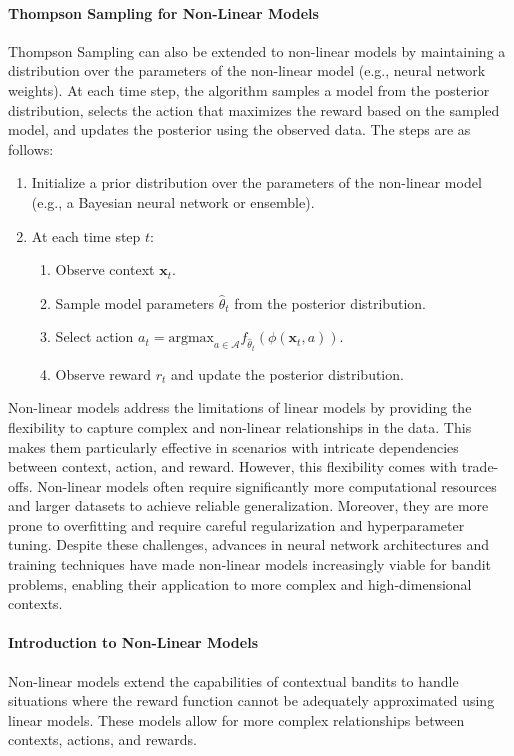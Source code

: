\paragraph{Thompson Sampling for Non-Linear Models}
Thompson Sampling can also be extended to non-linear models by maintaining a distribution over the parameters of the non-linear model (e.g., neural network weights). At each time step, the algorithm samples a model from the posterior distribution, selects the action that maximizes the reward based on the sampled model, and updates the posterior using the observed data. The steps are as follows:
\begin{enumerate}
    \item Initialize a prior distribution over the parameters of the non-linear model (e.g., a Bayesian neural network or ensemble).
    \item At each time step $t$:
    \begin{enumerate}
        \item Observe context $\mathbf{x}_t$.
        \item Sample model parameters $\hat{\theta}_t$ from the posterior distribution.
        \item Select action $a_t = \text{argmax}_{a \in \mathcal{A}} f_{\hat{\theta}_t}(\phi(\mathbf{x}_t, a))$.
        \item Observe reward $r_t$ and update the posterior distribution.
    \end{enumerate}
\end{enumerate}

Non-linear models address the limitations of linear models by providing the flexibility to capture complex and non-linear relationships in the data. This makes them particularly effective in scenarios with intricate dependencies between context, action, and reward. However, this flexibility comes with trade-offs. Non-linear models often require significantly more computational resources and larger datasets to achieve reliable generalization. Moreover, they are more prone to overfitting and require careful regularization and hyperparameter tuning. Despite these challenges, advances in neural network architectures and training techniques have made non-linear models increasingly viable for bandit problems, enabling their application to more complex and high-dimensional contexts.


\paragraph{Introduction to Non-Linear Models}
Non-linear models extend the capabilities of contextual bandits to handle situations where the reward function cannot be adequately approximated using linear models. These models allow for more complex relationships between contexts, actions, and rewards.

